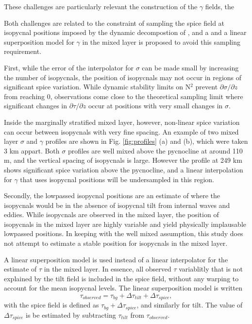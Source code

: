 \documentclass[preprint]{JASA}
\begin{document}
These challenges are particularly relevant the construction of the $\gamma$ fields, the 

Both challenges are related to the constraint of sampling the spice field at isopycnal positions imposed by the dynamic decompostion of \cite{dzieciuch2004}, and a and a linear superposition model for $\gamma$ in the mixed layer is proposed to avoid this sampling requirement.

First, while the error of the interpolator for $\sigma$ can be made small by increasing the number of isopycnals, the position of isopycnals may not occur in regions of significant spice variation. While dynamic stability limits on N$^2$ prevent $\partial \sigma / \partial z$ from reaching 0, observations come close to the theoretical sampling limit where significant changes in $\partial \tau / \partial z$ occur at positions with very small changes in $\sigma$.


 Inside the marginally stratified mixed layer, however, non-linear spice variation can occur between isopycnals with very fine spacing. An example of two mixed layer $\sigma$ and $\gamma$ profiles are shown in Fig. \ref{fig:profiles} (a) and (b), which were taken 3 km appart. Both $\sigma$ profiles are well mixed above the pycnocline at around 110 m, and the vertical spacing of isopycnals is large. However the profile at 249 km shows significant spice variation above the pycnocline, and a linear interpolation for $\gamma$ that uses isopycnal positions will be undersampled in this region.

Secondly, the lowpassed isopycnal positions are an estimate of where the isopycnals would be in the absence of isopycnal tilt from internal waves and eddies. While isopycnals are observed in the mixed layer, the position of isopycnals in the mixed layer are highly variable and yield physically implausable lowpassed positions. In keeping with the well mixed assumption, this study does not attempt to estimate a stable position for isopycnals in the mixed layer.

A linear superposition model is used instead of a linear interpolator for the estimate of $\tau$ in the mixed layer. In essence, all observed $\tau$ variablitly that is not explained by the tilt field is included in the spice field, without any warping to account for the mean isopycnal levels. The linear superposition model is written
\begin{equation}
    \tau_{observed} = \tau_{bg} + \Delta \tau_{tilt} + \Delta \tau_{spice},
\end{equation}
with the spice field is defined as $\tau_{bg} + \Delta \tau_{spice}$, and similarly for tilt. The value of $\Delta \tau_{spice}$ is be estimated by subtracting $\tau_{tilt}$ from $\tau_{observed}$.
\end{document}
